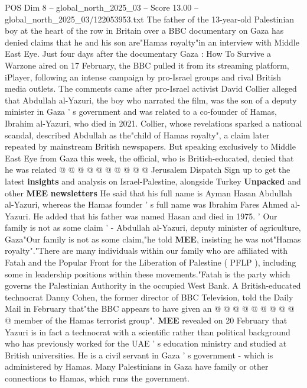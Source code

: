 \begin{textsample}{POS Dim 8 – global\_north\_2025\_03 – Score 13.00 – global\_north\_2025\_03/122053953.txt}  \label{ex:f8_pos_085}
The father of the 13-year-old Palestinian boy at the heart of the row in Britain over a BBC documentary on Gaza has denied claims that he and his son are"Hamas royalty"in an interview with Middle East Eye.
Just four days after the documentary Gaza : How To Survive a Warzone aired on 17 February, the BBC pulled it from its streaming platform, iPlayer, following an intense campaign by pro-Israel groups and rival British media outlets.
The comments came after pro-Israel activist David Collier alleged that Abdullah al-Yazuri, the boy who narrated the film, was the son of a deputy minister in Gaza ' s government and was related to a co-founder of Hamas, Ibrahim al-Yazuri, who died in 2021.
Collier, whose revelations sparked a national scandal, described Abdullah as the"child of Hamas royalty", a claim later repeated by mainstream British newspapers.
But speaking exclusively to Middle East Eye from Gaza this week, the official, who is British-educated, denied that he was related @ @ @ @ @ @ @ @ @ @ Jerusalem Dispatch Sign up to get the latest \textbf{insights} and analysis on Israel-Palestine, alongside Turkey \textbf{Unpacked} and other \textbf{MEE} \textbf{newsletters} He said that his full name is Ayman Hasan Abdullah al-Yazuri, whereas the Hamas founder ' s full name was Ibrahim Fares Ahmed al-Yazuri.
He added that his father was named Hasan and died in 1975. ' Our family is not as some claim ' - Abdullah al-Yazuri, deputy minister of agriculture, Gaza"Our family is not as some claim,"he told \textbf{MEE}, insisting he was not"Hamas royalty"."There are many individuals within our family who are affiliated with Fatah and the Popular Front for the Liberation of Palestine ( PFLP ), including some in leadership positions within these movements."Fatah is the party which governs the Palestinian Authority in the occupied West Bank.
A British-educated technocrat Danny Cohen, the former director of BBC Television, told the Daily Mail in February that"the BBC appears to have given an @ @ @ @ @ @ @ @ @ @ member of the Hamas terrorist group". \textbf{MEE} revealed on 20 February that Yazuri is in fact a technocrat with a scientific rather than political background who has previously worked for the UAE ' s education ministry and studied at British universities.
He is a civil servant in Gaza ' s government - which is administered by Hamas.
Many Palestinians in Gaza have family or other connections to Hamas, which runs the government.

\end{textsample}
